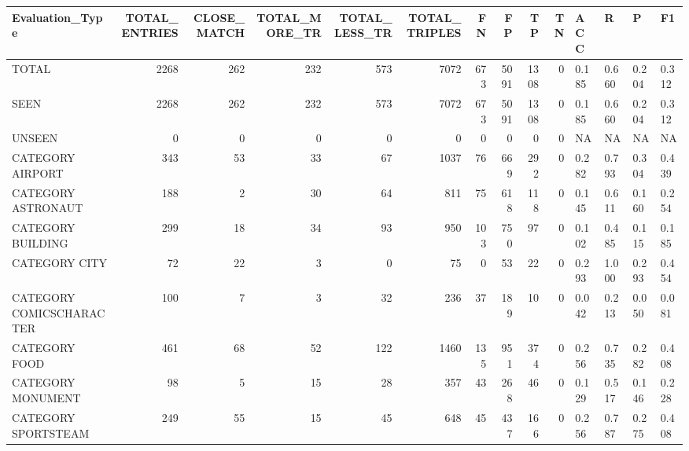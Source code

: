 \begin{tabular}{lrrrrrrrrrllll}
\hline
 Evaluation\_Type          &   TOTAL\_ENTRIES &   CLOSE\_MATCH &   TOTAL\_MORE\_TR &   TOTAL\_LESS\_TR &   TOTAL\_TRIPLES &   FN &   FP &   TP &   TN & ACC   & R     & P     & F1    \\
\hline
 TOTAL                    &            2268 &           262 &             232 &             573 &            7072 &  673 & 5091 & 1308 &    0 & 0.185 & 0.660 & 0.204 & 0.312 \\
 SEEN                     &            2268 &           262 &             232 &             573 &            7072 &  673 & 5091 & 1308 &    0 & 0.185 & 0.660 & 0.204 & 0.312 \\
 UNSEEN                   &               0 &             0 &               0 &               0 &               0 &    0 &    0 &    0 &    0 & NA    & NA    & NA    & NA    \\
 CATEGORY AIRPORT         &             343 &            53 &              33 &              67 &            1037 &   76 &  669 &  292 &    0 & 0.282 & 0.793 & 0.304 & 0.439 \\
 CATEGORY ASTRONAUT       &             188 &             2 &              30 &              64 &             811 &   75 &  618 &  118 &    0 & 0.145 & 0.611 & 0.160 & 0.254 \\
 CATEGORY BUILDING        &             299 &            18 &              34 &              93 &             950 &  103 &  750 &   97 &    0 & 0.102 & 0.485 & 0.115 & 0.185 \\
 CATEGORY CITY            &              72 &            22 &               3 &               0 &              75 &    0 &   53 &   22 &    0 & 0.293 & 1.000 & 0.293 & 0.454 \\
 CATEGORY COMICSCHARACTER &             100 &             7 &               3 &              32 &             236 &   37 &  189 &   10 &    0 & 0.042 & 0.213 & 0.050 & 0.081 \\
 CATEGORY FOOD            &             461 &            68 &              52 &             122 &            1460 &  135 &  951 &  374 &    0 & 0.256 & 0.735 & 0.282 & 0.408 \\
 CATEGORY MONUMENT        &              98 &             5 &              15 &              28 &             357 &   43 &  268 &   46 &    0 & 0.129 & 0.517 & 0.146 & 0.228 \\
 CATEGORY SPORTSTEAM      &             249 &            55 &              15 &              45 &             648 &   45 &  437 &  166 &    0 & 0.256 & 0.787 & 0.275 & 0.408 \\

\end{tabular}
